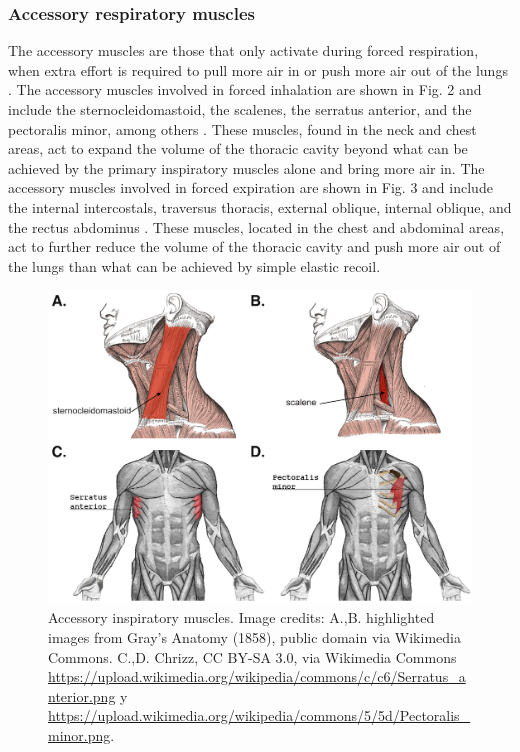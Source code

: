 \documentclass{article}
\begin{document}
\subsubsection{Accessory respiratory muscles}

The accessory muscles are those that only activate during forced respiration, when extra effort is required to pull more air in or push more air out of the lungs \citep{sieck2013mechanical, openStax_breathing}. The accessory muscles involved in forced inhalation are shown in Fig. 2 and include the sternocleidomastoid, the scalenes, the serratus anterior, and the pectoralis minor, among others \citep{troyer1986action, ratnovsky2008mechanics}. These muscles, found in the neck and chest areas, act to expand the volume of the thoracic cavity beyond what can be achieved by the primary inspiratory muscles alone and bring more air in. The accessory muscles involved in forced expiration are shown in Fig. 3 and include the internal intercostals, traversus thoracis, external oblique, internal oblique, and the rectus abdominus \citep{troyer1986action, ratnovsky2008mechanics}. These muscles, located in the chest and abdominal areas, act to further reduce the volume of the thoracic cavity and push more air out of the lungs than what can be achieved by simple elastic recoil.

\begin{figure}[!htbp]
\centering
\includegraphics[width=0.8\linewidth]{files/EPpXta8zJdzN048lz8AR-6be73ad85c5be0acd5ff6f42ee00044f.png}
\caption[]{Accessory inspiratory muscles. Image credits: A.,B. highlighted images from Gray's Anatomy (1858), public domain via Wikimedia Commons. C.,D. Chrizz, CC BY-SA 3.0, via Wikimedia Commons \href{https://upload.wikimedia.org/wikipedia/commons/c/c6/Serratus\_anterior.png}{https://upload.wikimedia.org/wikipedia/commons/c/c6/Serratus\_anterior.png} y \href{https://upload.wikimedia.org/wikipedia/commons/5/5d/Pectoralis\_minor.png}{https://upload.wikimedia.org/wikipedia/commons/5/5d/Pectoralis\_minor.png}.}
\label{J6PBsiWSRk}
\end{figure}
\end{document}
